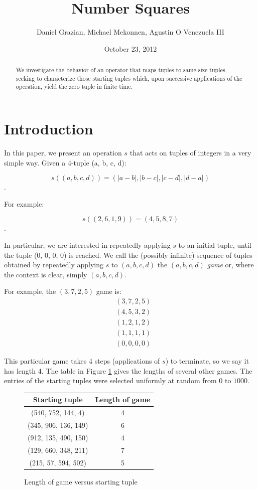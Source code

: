 \documentclass[12pt]{amsart}
\title{Number Squares}
\author{Daniel Grazian, Michael Mekonnen, Agustin O Venezuela III}
\date{October 23, 2012}
\newcommand{\diff}{s}
\begin{document}
\begin{abstract}
We investigate the behavior of an operator that maps tuples to same-size tuples, seeking to characterize those starting tuples which, upon successive applications of the operation, yield the zero tuple in finite time.
\end{abstract}

\maketitle

\section{Introduction\label{sec:intro}}

In this paper, we present an operation $\diff$ that acts on tuples of integers in a very simple way. Given a 4-tuple (a, b, c, d):

$$\diff((a, b, c, d)) = (|a - b|, |b - c|, |c - d|, |d - a|)$$. 

For example:

$$\diff((2, 6, 1, 9)) = (4, 5, 8, 7)$$.

In particular, we are interested in repeatedly applying $\diff$ to an initial tuple, until the tuple (0, 0, 0, 0) is reached. We call the (possibly infinite) sequence of tuples obtained by repeatedly applying $\diff$ to $(a, b, c, d)$  the $(a, b, c, d)$ \textit{game} or, where the context is clear, simply $(a, b, c, d)$.

For example, the  $(3, 7, 2, 5)$ game is:
\begin{align*}
& (3, 7, 2, 5) \\
& (4, 5, 3, 2) \\
& (1, 2, 1, 2) \\
& (1, 1, 1, 1) \\
& (0, 0, 0, 0)
\end{align*}

This particular game takes 4 steps (applications of $\diff$) to terminate, so we say it has length 4. The table in Figure \ref{fig: lengthVersusStartingTuple} gives the lengths of several other games. The entries of the starting tuples were selected uniformly at random from $0$ to $1000$.

\begin{figure}
\caption{Length of game versus starting tuple}
\label{fig: lengthVersusStartingTuple}
\begin{center}
    \begin{tabular}{| c | c |}
    \hline
    Starting tuple &  Length of game\\ \hline
    (540, 752, 144, 4) & 4\\ \hline
    (345, 906, 136, 149) & 6\\ \hline
    (912, 135, 490, 150) & 4\\ \hline
    (129, 660, 348, 211) & 7 \\ \hline
    (215, 57, 594, 502) & 5 \\ \hline
    \end{tabular}
\end{center}
\end{figure}
\end{document}
